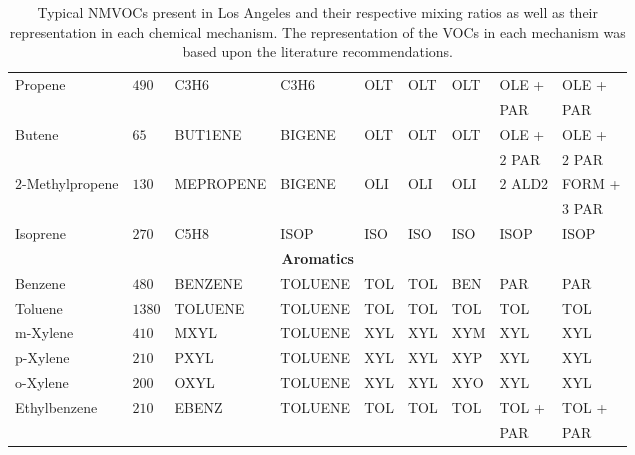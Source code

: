 \begin{sidewaystable}
\begin{tabular}{lllllllll}
        \multirow{2}{*}{Propene} & \multirow{2}{*}{$490$} & \multirow{2}{*}{C3H6} & \multirow{2}{*}{C3H6} & \multirow{2}{*}{OLT} & \multirow{2}{*}{OLT} & \multirow{2}{*}{OLT} & OLE + & OLE + \\ & & & & & & & \hspace{3mm}PAR & \hspace{3mm}PAR \\
        \multirow{2}{*}{Butene} & \multirow{2}{*}{$65$} & \multirow{2}{*}{BUT1ENE} & \multirow{2}{*}{BIGENE} & \multirow{2}{*}{OLT} & \multirow{2}{*}{OLT} & \multirow{2}{*}{OLT} & OLE + & OLE + \\ & & & & & & & \hspace{3mm}$2$ PAR & \hspace{3mm}$2$ PAR \\
        \multirow{2}{*}{$2$-Methylpropene} & \multirow{2}{*}{$130$} & \multirow{2}{*}{MEPROPENE} & \multirow{2}{*}{BIGENE} & \multirow{2}{*}{OLI} & \multirow{2}{*}{OLI} & \multirow{2}{*}{OLI} & \multirow{2}{*}{$2$ ALD2} & FORM + \\ & & & & & & & & \hspace{3mm}$3$ PAR \\
        Isoprene & $270$ & C5H8 & ISOP & ISO & ISO & ISO & ISOP & ISOP \\ \hline
        \multicolumn{9}{c}{\textbf{Aromatics}} \\ \hline 
        Benzene & $480$ & BENZENE & TOLUENE & TOL & TOL & BEN & PAR & PAR \\
        Toluene & $1380$ & TOLUENE & TOLUENE & TOL & TOL & TOL & TOL & TOL \\
        m-Xylene & $410$ & MXYL & TOLUENE & XYL & XYL & XYM & XYL & XYL \\
        p-Xylene & $210$ & PXYL & TOLUENE & XYL & XYL & XYP & XYL & XYL \\
        o-Xylene & $200$ & OXYL & TOLUENE & XYL & XYL & XYO & XYL & XYL \\
        \multirow{2}{*}{Ethylbenzene} & \multirow{2}{*}{$210$} & \multirow{2}{*}{EBENZ} & \multirow{2}{*}{TOLUENE} & \multirow{2}{*}{TOL} & \multirow{2}{*}{TOL} & \multirow{2}{*}{TOL} & TOL + & TOL + \\ & & & & & & & \hspace{3mm}PAR & \hspace{3mm}PAR \\ \hline \hline
    \end{tabular}
    \vspace{0mm}
    \caption{Typical NMVOCs present in Los Angeles and their respective mixing ratios \citep{Baker:2008} as well as their representation in each chemical mechanism. The representation of the VOCs in each mechanism was based upon the literature recommendations.}
    \vspace{-4mm}
    \label{t:initial_conditions}
\end{sidewaystable}


